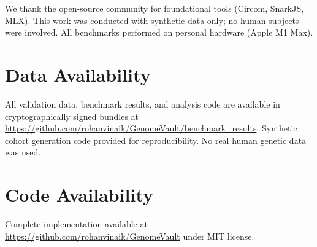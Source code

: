 \documentclass[11pt,letterpaper]{article}
\begin{document}
We thank the open-source community for foundational tools (Circom, SnarkJS, MLX). This work was conducted with synthetic data only; no human subjects were involved. All benchmarks performed on personal hardware (Apple M1 Max).

\section*{Data Availability}

All validation data, benchmark results, and analysis code are available in cryptographically signed bundles at \url{https://github.com/rohanvinaik/GenomeVault/benchmark_results}. Synthetic cohort generation code provided for reproducibility. No real human genetic data was used.

\section*{Code Availability}

Complete implementation available at \url{https://github.com/rohanvinaik/GenomeVault} under MIT license.
\end{document}
